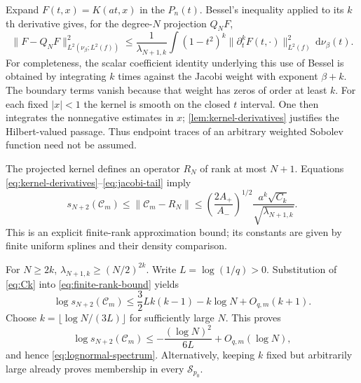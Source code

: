 \documentclass[11pt,a4paper]{article}
\numberwithin{equation}{section}
\theoremstyle{definition}\newtheorem{definition}[theorem]{Definition}
\theoremstyle{remark}\newtheorem{remark}[theorem]{Remark}
\newcommand{\dd}{\,\mathrm d}\newcommand{\ii}{\mathrm i}
\newcommand{\calC}{\mathcal C_m}\newcommand{\calP}{\mathcal P}
\newcommand{\norm}[1]{\lVert #1\rVert}
\begin{document}
Expand $F(t,x)=K(at,x)$ in the $P_n(t)$. Bessel's inequality applied to its $k$th derivative gives, for the degree-$N$ projection $Q_NF$,
\begin{equation}
 \norm{F-Q_NF}_{L^2(\nu_\beta;L^2(f))}^2
 \le\frac{1}{\lambda_{N+1,k}}
 \int(1-t^2)^k\norm{\partial_t^kF(t,\cdot)}_{L^2(f)}^2\dd\nu_\beta(t).
 \label{eq:jacobi-tail}
\end{equation}
For completeness, the scalar coefficient identity underlying this use of Bessel is obtained by integrating $k$ times against the Jacobi weight with exponent $\beta+k$. The boundary terms vanish because that weight has zeros of order at least $k$. For each fixed $|x|<1$ the kernel is smooth on the closed $t$ interval. One then integrates the nonnegative estimates in $x$; \cref{lem:kernel-derivatives} justifies the Hilbert-valued passage. Thus endpoint traces of an arbitrary weighted Sobolev function need not be assumed.

The projected kernel defines an operator $R_N$ of rank at most $N+1$. Equations \eqref{eq:kernel-derivatives}--\eqref{eq:jacobi-tail} imply
\begin{equation}
 s_{N+2}(\calC)\le\norm{\calC-R_N}
 \le \left(\frac{2A_+}{A_-}\right)^{1/2}
 \frac{a^k\sqrt{C_k}}{\sqrt{\lambda_{N+1,k}}}.
 \label{eq:finite-rank-bound}
\end{equation}
This is an explicit finite-rank approximation bound; its constants are given by finite uniform splines and their density comparison.

For $N\ge2k$, $\lambda_{N+1,k}\ge(N/2)^{2k}$. Write $L=\log(1/q)>0$. Substitution of \eqref{eq:Ck} into \eqref{eq:finite-rank-bound} yields
\begin{equation}
 \log s_{N+2}(\calC)
 \le \frac32Lk(k-1)-k\log N+O_{q,m}(k+1).
 \label{eq:optimize-k}
\end{equation}
Choose $k=\lfloor\log N/(3L)\rfloor$ for sufficiently large $N$. This proves
\[
 \log s_{N+2}(\calC)
 \le-\frac{(\log N)^2}{6L}+O_{q,m}(\log N),
\]
and hence \eqref{eq:lognormal-spectrum}. Alternatively, keeping $k$ fixed but arbitrarily large already proves membership in every $\mathcal S_{p_0}$.
\end{document}
